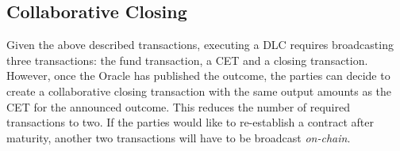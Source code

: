 \subsection{Collaborative Closing}

Given the above described transactions, executing a DLC requires broadcasting three transactions: the fund transaction, a CET and a closing transaction.
However, once the Oracle has published the outcome, the parties can decide to create a collaborative closing transaction with the same output amounts as the CET for the announced outcome.
This reduces the number of required transactions to two.
If the parties would like to re-establish a contract after maturity, another two transactions will have to be broadcast \emph{on-chain}.
